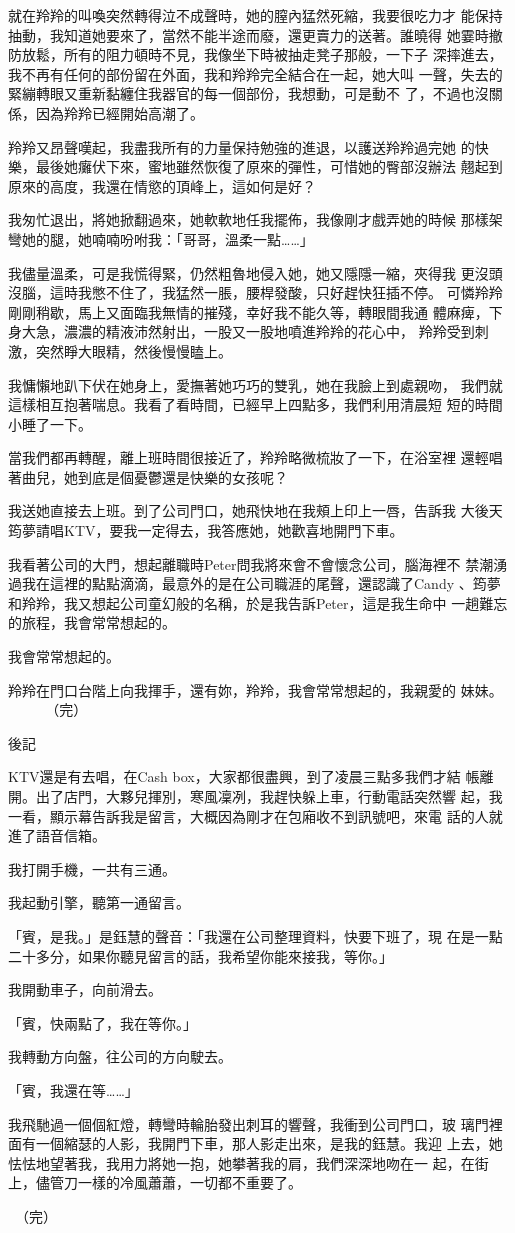 就在羚羚的叫喚突然轉得泣不成聲時，她的膣內猛然死縮，我要很吃力才
能保持抽動，我知道她要來了，當然不能半途而廢，還更賣力的送著。誰曉得
她霎時撤防放鬆，所有的阻力頓時不見，我像坐下時被抽走凳子那般，一下子
深摔進去，我不再有任何的部份留在外面，我和羚羚完全結合在一起，她大叫
一聲，失去的緊繃轉眼又重新黏纏住我器官的每一個部份，我想動，可是動不
了，不過也沒關係，因為羚羚已經開始高潮了。

羚羚又昂聲嘆起，我盡我所有的力量保持勉強的進退，以護送羚羚過完她
的快樂，最後她癱伏下來，蜜地雖然恢復了原來的彈性，可惜她的臀部沒辦法
翹起到原來的高度，我還在情慾的頂峰上，這如何是好？

我匆忙退出，將她掀翻過來，她軟軟地任我擺佈，我像剛才戲弄她的時候
那樣架彎她的腿，她喃喃吩咐我：「哥哥，溫柔一點……」

我儘量溫柔，可是我慌得緊，仍然粗魯地侵入她，她又隱隱一縮，夾得我
更沒頭沒腦，這時我憋不住了，我猛然一脹，腰桿發酸，只好趕快狂插不停。
可憐羚羚剛剛稍歇，馬上又面臨我無情的摧殘，幸好我不能久等，轉眼間我通
體麻痺，下身大急，濃濃的精液沛然射出，一股又一股地噴進羚羚的花心中，
羚羚受到刺激，突然睜大眼精，然後慢慢瞌上。

我慵懶地趴下伏在她身上，愛撫著她巧巧的雙乳，她在我臉上到處親吻，
我們就這樣相互抱著喘息。我看了看時間，已經早上四點多，我們利用清晨短
短的時間小睡了一下。

當我們都再轉醒，離上班時間很接近了，羚羚略微梳妝了一下，在浴室裡
還輕唱著曲兒，她到底是個憂鬱還是快樂的女孩呢？

我送她直接去上班。到了公司門口，她飛快地在我頰上印上一唇，告訴我
大後天筠夢請唱KTV，要我一定得去，我答應她，她歡喜地開門下車。

我看著公司的大門，想起離職時Peter問我將來會不會懷念公司，腦海裡不
禁潮湧過我在這裡的點點滴滴，最意外的是在公司職涯的尾聲，還認識了Candy
、筠夢和羚羚，我又想起公司童幻般的名稱，於是我告訴Peter，這是我生命中
一趟難忘的旅程，我會常常想起的。

我會常常想起的。

羚羚在門口台階上向我揮手，還有妳，羚羚，我會常常想起的，我親愛的
妹妹。
　
　
（完）


後記


KTV還是有去唱，在Cash box，大家都很盡興，到了凌晨三點多我們才結
帳離開。出了店門，大夥兒揮別，寒風凜冽，我趕快躲上車，行動電話突然響
起，我一看，顯示幕告訴我是留言，大概因為剛才在包廂收不到訊號吧，來電
話的人就進了語音信箱。

我打開手機，一共有三通。

我起動引擎，聽第一通留言。

「賓，是我。」是鈺慧的聲音：「我還在公司整理資料，快要下班了，現
在是一點二十多分，如果你聽見留言的話，我希望你能來接我，等你。」

我開動車子，向前滑去。

「賓，快兩點了，我在等你。」

我轉動方向盤，往公司的方向駛去。

「賓，我還在等……」

我飛馳過一個個紅燈，轉彎時輪胎發出刺耳的響聲，我衝到公司門口，玻
璃門裡面有一個縮瑟的人影，我開門下車，那人影走出來，是我的鈺慧。我迎
上去，她怯怯地望著我，我用力將她一抱，她攀著我的肩，我們深深地吻在一
起，在街上，儘管刀一樣的冷風蕭蕭，一切都不重要了。　

　（完）










